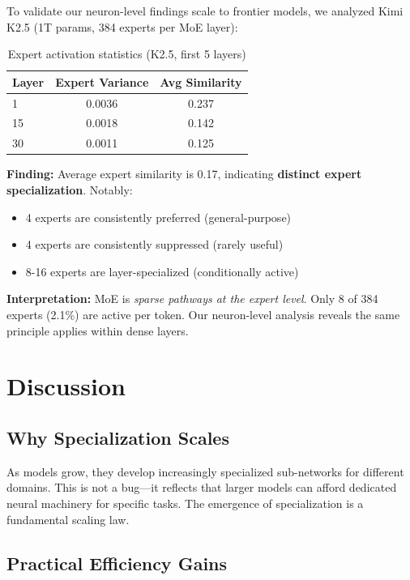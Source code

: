\documentclass{article}
\begin{document}
To validate our neuron-level findings scale to frontier models, we analyzed Kimi K2.5 (1T params, 384 experts per MoE layer):

\begin{table}[h]
\centering
\caption{Expert activation statistics (K2.5, first 5 layers)}
\label{tab:moe}
\begin{tabular}{lcc}
\toprule
\textbf{Layer} & \textbf{Expert Variance} & \textbf{Avg Similarity} \\
\midrule
1 & 0.0036 & 0.237 \\
15 & 0.0018 & 0.142 \\
30 & 0.0011 & 0.125 \\
\bottomrule
\end{tabular}
\end{table}

\textbf{Finding:} Average expert similarity is 0.17, indicating \textbf{distinct expert specialization}. Notably:
\begin{itemize}
    \item 4 experts are consistently preferred (general-purpose)
    \item 4 experts are consistently suppressed (rarely useful)
    \item 8-16 experts are layer-specialized (conditionally active)
\end{itemize}

\textbf{Interpretation:} MoE is \textit{sparse pathways at the expert level}. Only 8 of 384 experts (2.1\%) are active per token. Our neuron-level analysis reveals the same principle applies within dense layers.

\section{Discussion}

\subsection{Why Specialization Scales}

As models grow, they develop increasingly specialized sub-networks for different domains. This is not a bug---it reflects that larger models can afford dedicated neural machinery for specific tasks. The emergence of specialization is a fundamental scaling law.

\subsection{Practical Efficiency Gains}
\end{document}
